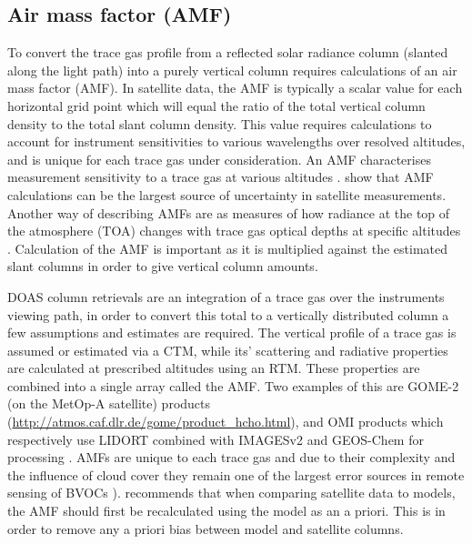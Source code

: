   \subsection{Air mass factor (AMF)}
  \label{Model:omhcho:amf}
    To convert the trace gas profile from a reflected solar radiance column (slanted along the light path) into a purely vertical column requires calculations of an air mass factor (AMF).
    In satellite data, the AMF is typically a scalar value for each horizontal grid point which will equal the ratio of the total vertical column density to the total slant column density.
    This value requires calculations to account for instrument sensitivities to various wavelengths over resolved altitudes, and is unique for each trace gas under consideration.
    An AMF characterises measurement sensitivity to a trace gas at various altitudes \cite[e.g.]{Palmer2001}.
    \textcite{Lorente2017} show that AMF calculations can be the largest source of uncertainty in satellite measurements.
    Another way of describing AMFs are as measures of how radiance at the top of the atmosphere (TOA) changes with trace gas optical depths at specific altitudes \parencite{Lorente2017}.
    Calculation of the AMF is important as it is multiplied against the estimated slant columns in order to give vertical column amounts.
    
    DOAS column retrievals are an integration of a trace gas over the instruments viewing path, in order to convert this total to a vertically distributed column a few assumptions and estimates are required. 
    The vertical profile of a trace gas is assumed or estimated via a CTM, while its' scattering and radiative properties are calculated at prescribed altitudes using an RTM. 
    These properties are combined into a single array called the AMF.
    Two examples of this are GOME-2 (on the MetOp-A satellite) products (\url{http://atmos.caf.dlr.de/gome/product_hcho.html}), and OMI products which respectively use LIDORT combined with IMAGESv2 and GEOS-Chem for processing \parencite{Chance2002, Abad2015}.
    AMFs are unique to each trace gas and due to their complexity and the influence of cloud cover they remain one of the largest error sources in remote sensing of BVOCs \parencite{Palmer2001,Millet2006}).
    \textcite{Lamsal2014} recommends that when comparing satellite data to models, the AMF should first be recalculated using the model as an a priori.
    This is in order to remove any a priori bias between model and satellite columns.
    
